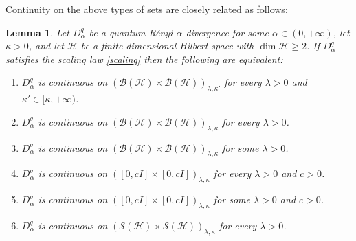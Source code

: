 \documentclass[unsortedaddress,superscriptaddress,pra,notitlepage]{revtex4}
\newtheorem{lemma}[definition]{Lemma}
\def\B{{\mathcal B}}
\def\S{{\mathcal S}}
\def\hil{{\mathcal H}}
\def\iff{\Longleftrightarrow}
\def\imp{\Longrightarrow}
\def\pwr{\kappa}
\begin{document}
Continuity on the above types of sets are closely related as follows:
\begin{lemma}\label{lemma:B S cont}
Let $D_{\alpha}^q$ be a quantum R\'enyi $\alpha$-divergence for some $\alpha\in(0,+\infty)$,
let $\pwr>0$,
and let $\hil$ be a finite-dimensional Hilbert space with $\dim\hil\ge 2$.
If $D_{\alpha}^q$ satisfies the scaling law \eqref{scaling} then
the following are equivalent:
\begin{enumerate}
\item\label{az cont dom0}
$D_{\alpha}^q$ is continuous on $(\B(\hil)\times\B(\hil))_{\lambda,\pwr'}$ for every $\lambda>0$ and $\pwr'\in[\pwr,+\infty)$. 
\item\label{az cont dom1}
$D_{\alpha}^q$ is continuous on $(\B(\hil)\times\B(\hil))_{\lambda,\pwr}$ for every $\lambda>0$.
\item\label{az cont dom2}
$D_{\alpha}^q$ is continuous on $(\B(\hil)\times\B(\hil))_{\lambda,\pwr}$ for some $\lambda>0$.
\item\label{az cont dom3}
$D_{\alpha}^q$ is continuous on $([0,cI]\times[0,cI])_{\lambda,\pwr}$ for every $\lambda>0$ and $c>0$.
\item\label{az cont dom4}
$D_{\alpha}^q$ is continuous on $([0,cI]\times[0,cI])_{\lambda,\pwr}$ for some $\lambda>0$
and $c>0$.
\item\label{az cont dom5}
$D_{\alpha}^q$ is continuous on $(\S(\hil)\times\S(\hil))_{\lambda,\pwr}$ for every $\lambda>0$.
\end{enumerate}
\end{lemma}
\end{document}
